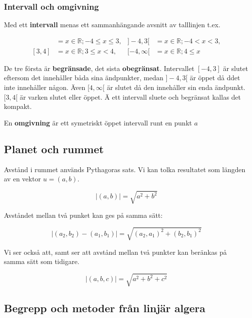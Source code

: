 \documentclass[12pt]{article} %
\begin{document}
\subsubsection{Intervall och omgivning}
Med ett \textbf{intervall} menas ett sammanhängande avsnitt av talllinjen t.ex.

\begin{align*}
    [-4, 3] &= {x \in \mathbb{R} ; -4 \leq x \leq 3}, & ]-4, 3[ &= {x \in \mathbb{R} ; -4 < x < 3}, \\
    [3, 4] &= {x \in \mathbb{R} ; 3 \leq x < 4}, & [-4, \infty [ &= {x \in \mathbb{R} ; 4 \leq x}
\end{align*}

De tre första är \textbf{begränsade}, det sista \textbf{obegränsat}. Intervallet $[-4, 3]$ är slutet eftersom det innehåller båda sina ändpunkter, medan $]-4, 3[$ är öppet då ddet inte innehåller någon. Även $[4, \infty[$ är slutet då den innehåller sin enda ändpunkt. $[3, 4[$ är varken slutet eller öppet. Ä ett intervall sluete och begränsat kallas det kompakt.

\par En \textbf{omgivning} är ett symetriskt öppet intervall runt en punkt $a$

\subsection{Planet och rummet} %
Avstånd i rummet används Pythagoras sats. Vi kan tolka resultatet som längden av en vektor $u = (a, b)$.

\[
    |(a, b)| = \sqrt{a^2 + b^2}
\]

Avståndet mellan två punket kan ges på samma sätt:

\[
    |(a_{2}, b_{2}) - (a_{1}, b_{1})| = \sqrt{(a_{2}, a_{1})^2 + (b_{2}, b_{1})^2}
\]

Vi ser också att, samt ser att avstånd mellan två punkter kan beränkas på samma sätt som tidigare.

\[
    |(a, b, c)| = \sqrt{a^2 + b^2 + c^2}
\]
\subsection{Begrepp och metoder från linjär algera} %
\end{document}
